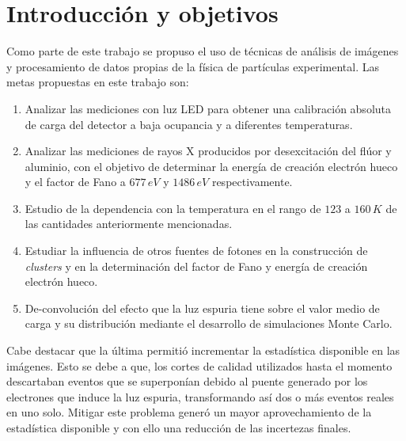 \newpage
{}  %
\setcounter{page}{1}    %

\chapter{Introducción y objetivos}
\noindent Como parte de este trabajo se propuso el uso de técnicas de análisis de imágenes y procesamiento de datos propias de la física de partículas experimental.%
Las metas propuestas en este trabajo son:
\begin{enumerate}
    \item Analizar las mediciones con luz LED para obtener una calibración absoluta de carga del detector a baja ocupancia y a diferentes temperaturas.
    \item Analizar las mediciones de rayos X producidos por desexcitación del flúor y aluminio, con el objetivo de determinar la energía de creación electrón hueco y el factor de Fano a $677\,\si{eV}$ y $1486\,\si{eV}$ respectivamente.
    \item Estudio de la dependencia con la temperatura en el rango de $123$ a $160\,\si{K}$ de las cantidades anteriormente mencionadas.
    \item Estudiar la influencia de otros fuentes de fotones en la construcción de \textit{clusters} y en la determinación del factor de Fano y energía de creación electrón hueco.
    \item De-convolución del efecto que la luz espuria tiene sobre el valor medio de carga y su distribución mediante el desarrollo de simulaciones Monte Carlo.
\end{enumerate}
Cabe destacar que la última permitió incrementar la estadística disponible en las imágenes. Esto se debe a que, los cortes de calidad utilizados hasta el momento descartaban eventos que se superponían debido al puente generado por los electrones que induce la luz espuria, transformando así dos o más eventos reales en uno solo. Mitigar este problema generó un mayor aprovechamiento de la estadística disponible y con ello una reducción de las incertezas finales.
